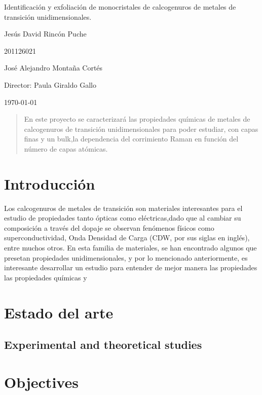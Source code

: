 \documentclass{article}
\begin{document}
\begin{center}
\Huge
Identificación y exfoliación de monocristales de calcogenuros de metales de transición unidimensionales.

\vspace{3mm}
\Large Jesús David Rincón Puche

\large
201126021

\Large José Alejandro Montaña Cortés
\large 


\vspace{2mm}
\Large
Director: Paula Giraldo Gallo\\


\normalsize
\vspace{2mm}

\today
\end{center}

\begin{abstract}
 En este proyecto se caracterizará las propiedades químicas de metales de calcogenuros de transición unidimensionales para poder estudiar, con capas finas y un bulk,la dependencia del corrimiento Raman en función del número de capas atómicas.
\end{abstract}

\normalsize
\section{Introducción}

Los calcogenuros de metales de transición son materiales interesantes para el estudio de propiedades tanto ópticas como eléctricas,dado que al cambiar su composición a través del dopaje se observan fenómenos físicos como superconductividad, Onda Densidad de Carga (CDW, por sus siglas en inglés), entre muchos otros. En esta familia de materiales, se han encontrado algunos que presetan propiedades unidimensionales, y por lo mencionado anteriormente, es interesante desarrollar un estudio para entender de mejor manera las propiedades las propiedades químicas y 

\section{Estado del arte}
\subsection{Experimental and theoretical studies}



\section{Objectives}
\end{document}
